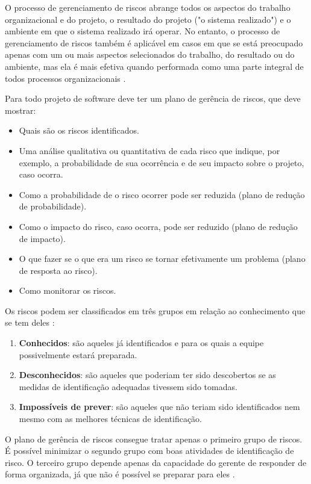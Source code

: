 \documentclass[
	12pt,
	openright,
	twoside,
	a4paper,
	english,
	brazil
	]{abntex2}
\begin{document}
O processo de gerenciamento de riscos abrange todos os aspectos do trabalho organizacional e do projeto, o resultado do projeto ("o sistema realizado") e o ambiente em que o sistema realizado irá operar. No entanto, o processo de gerenciamento de riscos também é aplicável em casos em que se está preocupado apenas com um ou mais aspectos selecionados do trabalho, do resultado ou do ambiente, mas ela é mais efetiva quando performada como uma parte integral de todos processos organizacionais \cite{iso16085}.

Para  todo projeto de software deve ter um plano de gerência de riscos, que deve mostrar:

\begin{itemize}
  \item Quais são os riscos identificados.
  \item Uma análise qualitativa ou quantitativa de cada risco que indique, por exemplo, a probabilidade de sua ocorrência e de seu impacto sobre o projeto, caso ocorra.
  \item Como a probabilidade de o risco ocorrer pode ser reduzida (plano de redução de probabilidade).
  \item Como o impacto do risco, caso ocorra, pode ser reduzido (plano de redução de impacto).
  \item O que fazer se o que era um risco se tornar efetivamente um problema (plano de resposta ao risco).
  \item Como monitorar os riscos.
\end{itemize}

Os riscos podem ser classificados em três grupos em relação ao conhecimento que se tem deles \cite{wazlawick2019}:

\begin{enumerate}
  \item \textbf{Conhecidos}: são aqueles já identificados e para os quais a equipe possivelmente estará preparada.
  \item \textbf{Desconhecidos}: são aqueles que poderiam ter sido descobertos se as medidas de identificação adequadas tivessem sido tomadas.
  \item \textbf{Impossíveis de prever}: são aqueles que não teriam sido identificados nem mesmo com as melhores técnicas de identificação.
\end{enumerate}

O plano de gerência de riscos consegue tratar apenas o primeiro grupo de riscos. É possível minimizar o segundo grupo com boas atividades de identificação de risco. O terceiro grupo depende apenas da capacidade do gerente de responder de forma organizada, já que não é possível se preparar para eles \cite{wazlawick2019}.
\end{document}
